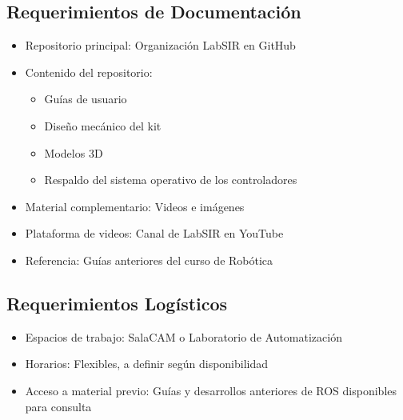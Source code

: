 \subsection{Requerimientos de Documentación}
\begin{itemize}
    \item Repositorio principal: Organización LabSIR en GitHub
    \item Contenido del repositorio:
    \begin{itemize}
        \item Guías de usuario
        \item Diseño mecánico del kit
        \item Modelos 3D
        \item Respaldo del sistema operativo de los controladores
    \end{itemize}
    \item Material complementario: Videos e imágenes
    \item Plataforma de videos: Canal de LabSIR en YouTube
    \item Referencia: Guías anteriores del curso de Robótica
\end{itemize}

\subsection{Requerimientos Logísticos}
\begin{itemize}
    \item Espacios de trabajo: SalaCAM o Laboratorio de Automatización
    \item Horarios: Flexibles, a definir según disponibilidad
    \item Acceso a material previo: Guías y desarrollos anteriores de ROS disponibles para consulta
\end{itemize}